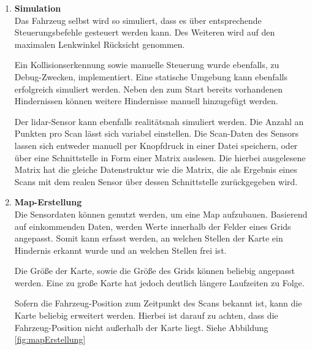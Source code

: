 \begin{enumerate}[leftmargin=*]
    \item \textbf{Simulation} \\
    Das Fahrzeug selbst wird so simuliert, dass es über entsprechende Steuerungsbefehle gesteuert werden kann.
    Des Weiteren wird auf den maximalen Lenkwinkel Rücksicht genommen.
    
    Ein Kollisionserkennung sowie manuelle Steuerung wurde ebenfalls, zu Debug-Zwecken, implementiert.
    Eine statische Umgebung kann ebenfalls erfolgreich simuliert werden.
    Neben den zum Start bereits vorhandenen Hindernissen können weitere Hindernisse manuell hinzugefügt werden.
    
    Der \ac{lidar}-Sensor kann ebenfalls realitätsnah simuliert werden.
    Die Anzahl an Punkten pro Scan lässt sich variabel einstellen.
    Die Scan-Daten des Sensors lassen sich entweder manuell per Knopfdruck in einer Datei speichern, 
    oder über eine Schnittstelle in Form einer Matrix auslesen.
    Die hierbei ausgelesene Matrix hat die gleiche Datenstruktur wie die Matrix, 
    die als Ergebnis eines Scans mit dem realen Sensor über dessen Schnittstelle zurückgegeben wird.

    \item \textbf{Map-Erstellung} \\
    Die Sensordaten können genutzt werden, um eine Map aufzubauen.
    Basierend auf einkommenden Daten, werden Werte innerhalb der Felder eines Grids angepasst.
    Somit kann erfasst werden, an welchen Stellen der Karte ein Hindernis erkannt wurde und an welchen Stellen frei ist.
    
    Die Größe der Karte, sowie die Größe des Grids können beliebig angepasst werden.
    Eine zu große Karte hat jedoch deutlich längere Laufzeiten zu Folge.

    Sofern die Fahrzeug-Position zum Zeitpunkt des Scans bekannt ist, kann die Karte beliebig erweitert werden.
    Hierbei ist darauf zu achten, dass die Fahrzeug-Position nicht außerhalb der Karte liegt.
    Siehe Abbildung \ref{fig:mapErstellung}


\end{enumerate}

